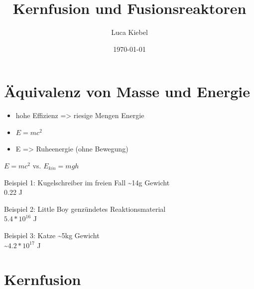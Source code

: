 \documentclass[10pt,a4paper, ngerman]{beamer}
\author{Luca Kiebel}
\title{Kernfusion und Fusionsreaktoren}
\date{\today}
\institute[HBBK]{Hans-Böckler-Berufskolleg}
\begin{document}
\begin{frame}
\titlepage
\end{frame}

\section[Energie aus Masse]{Äquivalenz von Masse und Energie}
\begin{frame}{\secname}{\subsecname}
\begin{itemize}[<+->]
\item hohe Effizienz => riesige Mengen Energie
\item \(E=mc^2\)
\item E => Ruheenergie (ohne Bewegung)
\end{itemize}
\end{frame}

\begin{frame}{\secname}{\(E=mc^2\) vs. \(E_{kin}=mgh\)}
\begin{exampleblock}{Beispiel 1: Kugelschreiber im freien Fall}
	\textasciitilde14g Gewicht \\
	0.22 J
\end{exampleblock}
\pause
\begin{exampleblock}{Beispiel 2: Little Boy} %
	 genzündetes Reaktionsmaterial \\
	\(5.4*10^{16}\) J 
\end{exampleblock}
\pause[4]
\begin{exampleblock}{Beispiel 3: Katze}
	\textasciitilde5kg Gewicht \\
	\textasciitilde\(4.2*10^{17}\) J
\end{exampleblock}
\end{frame}


\section{Kernfusion}
\end{document}
